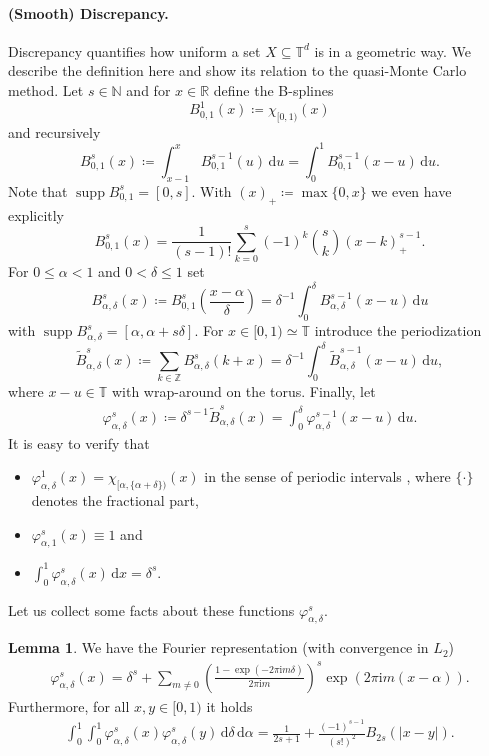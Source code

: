 \documentclass[a4paper,12pt]{article}
\numberwithin{equation}{section}
\theoremstyle{definition}
\newtheorem{lem}[thm]{Lemma}
\newcommand{\bbN}{\mathbb{N}}
\newcommand{\bbR}{\mathbb{R}}
\newcommand{\bbT}{\mathbb{T}}
\newcommand{\bbZ}{\mathbb{Z}}
\newcommand{\sbse}{\subseteq}
\newcommand{\iu}{\mathrm{i}}
\newcommand{\supp}{\operatorname{supp}}
\newcommand{\dx}{\text{d}}
\begin{document}
\paragraph{(Smooth) Discrepancy.} Discrepancy quantifies how uniform a set $X \sbse \bbT^d$ is in a geometric way. We describe the definition here and show its relation to the quasi-Monte Carlo method. Let $s \in \bbN$ and for $x \in \bbR$ define the B-splines
$$
B_{0, 1}^1(x) \coloneqq \chi^{}_{[0, 1)}(x)
$$
and recursively
$$
B_{0, 1}^s(x) \coloneqq \int_{x-1}^x B_{0, 1}^{s-1}(u) \, \dx u = \int_0^1 B_{0, 1}^{s-1}(x-u) \, \dx u.
$$
Note that $\supp B_{0, 1}^s = [0, s]$. With $(x)_+ \coloneqq \max\{0, x\}$ we even have explicitly
$$
B_{0, 1}^s(x) = \frac{1}{(s-1)!} \sum_{k=0}^s (-1)^k {s \choose k} (x-k)_+^{s-1}.
$$
For $0 \leq \alpha < 1$ and $0 < \delta \leq 1$ set
$$
B_{\alpha, \delta}^s(x) \coloneqq B_{0, 1}^s\left(\frac{x-\alpha}\delta\right) = \delta^{-1} \int_0^\delta B_{\alpha, \delta}^{s-1}(x-u) \, \dx u
$$
with $\supp B_{\alpha, \delta}^s = [\alpha, \alpha + s \delta]$. For $x \in [0, 1) \simeq \bbT$ introduce the periodization
$$
\tilde B_{\alpha, \delta}^s(x) \coloneqq \sum_{k \in \bbZ} B_{\alpha, \delta}^s(k+x) = \delta^{-1} \int_0^\delta \tilde B_{\alpha, \delta}^{s-1}(x-u) \, \dx u,
$$
where $x-u \in \bbT$ with wrap-around on the torus. Finally, let
\begin{align} \label{eq:phi_recursive}
	\varphi_{\alpha, \delta}^s(x) \coloneqq \delta^{s-1} \tilde B_{\alpha, \delta}^s(x) = \int_0^\delta \varphi_{\alpha, \delta}^{s-1}(x-u) \, \dx u.
\end{align}
It is easy to verify that
\begin{itemize}
	\item $\varphi_{\alpha, \delta}^1(x) = \chi^{}_{[\alpha, \{\alpha + \delta\})}(x)$ in the sense of periodic intervals \cite{HKP21}, where $\{\cdot\}$ denotes the fractional part,
	
	\item $\varphi_{\alpha, 1}^s(x) \equiv 1$ and
	
	\item $\int_0^1 \varphi_{\alpha, \delta}^s(x) \, \dx x = \delta^s$.
\end{itemize}
Let us collect some facts about these functions $\varphi_{\alpha, \delta}^s$.
\begin{lem} \label{lem:spline_properties}
	We have the Fourier representation (with convergence in $L_2$)
	\begin{align} \label{eq:spline_fourier}
		\varphi_{\alpha, \delta}^s(x) = \delta^s + \sum_{m \neq 0} \left(\frac{1-\exp(-2\pi\iu m \delta)}{2\pi\iu m}\right)^s \exp(2\pi\iu m (x-\alpha)).
	\end{align}
	Furthermore, for all $x, y \in [0, 1)$ it holds
	\begin{align} \label{eq:spline_inner_prod}
		\int_0^1 \int_0^1 \varphi_{\alpha, \delta}^s(x) \varphi_{\alpha, \delta}^s(y) \, \dx \delta \, \dx \alpha = \frac1{2s+1} + \frac{(-1)^{s-1}}{(s!)^2} B_{2s}(|x-y|).
	\end{align}
\end{lem}
\end{document}
